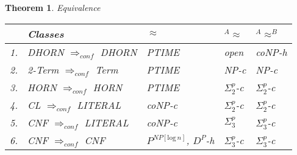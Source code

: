\documentclass[12pt]{article}
\newcommand{\AEQB}{\mbox{$^A$\hspace{-0.5mm}$\approx^B$}}
\newcommand{\AEQ}{\mbox{$^A$\hspace{-0.5mm}$\approx$}}
\newtheorem{theorem}{Theorem}[section]
\begin{document}
\begin{theorem}
Equivalence\\

\begin{tabular}{|l|l|l|l|l|}
\hline
 & {\em Classes} &  $\approx$ & \AEQ & \AEQB \\ \hline
1. & DHORN $\Rightarrow_{conf}$ DHORN & PTIME & open & coNP-h\\ \hline
2. & 2-Term $\Rightarrow_{conf}$ Term & PTIME & NP-c & NP-c\\ \hline
3. & HORN  $\Rightarrow_{conf}$ HORN & PTIME & $\Sigma^p_2$-c &  $\Sigma^p_2$-c \\ \hline
4. & CL $\Rightarrow_{conf}$ LITERAL & coNP-c & $\Sigma^p_2$-c & $\Sigma^p_2$-c\\ \hline
5. & CNF $\Rightarrow_{conf}$ LITERAL & coNP-c  & $\Sigma^p_3$ & $\Sigma^p_3$-c \\ \hline
6. & CNF $\Rightarrow_{conf}$ CNF & $P^{NP[\text{log}\, n]}$, $D^P$-h  & $\Sigma^p_3$-c& $\Sigma^p_3$-c \\ \hline

\end{tabular}
\end{theorem}
\vspace*{5mm}
\end{document}
